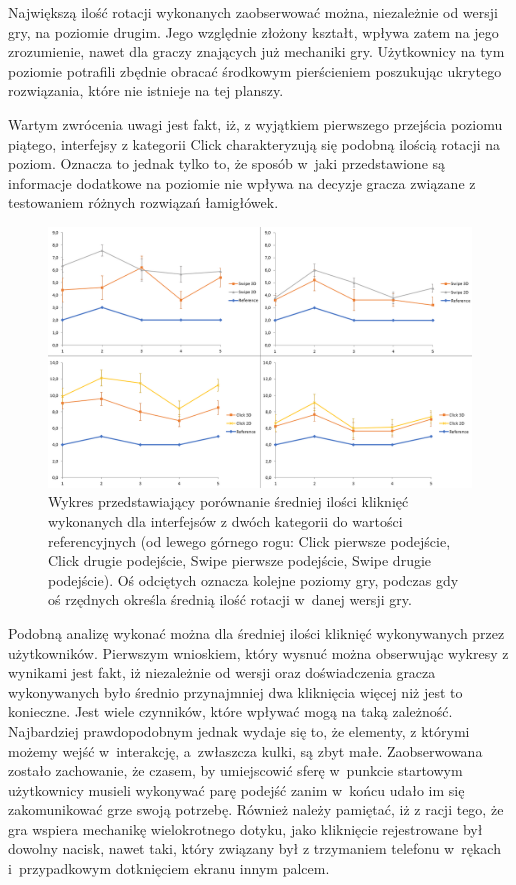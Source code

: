 \documentclass[a4paper,12pt,numbers=noenddot]{report}
\begin{document}
Największą ilość rotacji wykonanych zaobserwować można, niezależnie od wersji gry, na poziomie drugim. Jego względnie złożony kształt, wpływa zatem na jego zrozumienie, nawet dla graczy znających już mechaniki gry. Użytkownicy na tym poziomie potrafili zbędnie obracać środkowym pierścieniem poszukując ukrytego rozwiązania, które nie istnieje na tej planszy. 

Wartym zwrócenia uwagi jest fakt, iż, z wyjątkiem pierwszego przejścia poziomu piątego, interfejsy z kategorii Click charakteryzują się podobną ilością rotacji na poziom. Oznacza to jednak tylko to, że sposób w~jaki przedstawione są informacje dodatkowe na poziomie nie wpływa na decyzje gracza związane z testowaniem różnych rozwiązań łamigłówek. \\

\begin{figure}[h!]
	\centering
  	\includegraphics[width=\linewidth]{diag/ref_Clicks.png}
	\caption{Wykres przedstawiający porównanie średniej ilości kliknięć wykonanych dla interfejsów z dwóch kategorii do wartości referencyjnych (od lewego górnego rogu: Click pierwsze podejście, Click drugie podejście, Swipe pierwsze podejście, Swipe drugie podejście). Oś odciętych oznacza kolejne poziomy gry, podczas gdy oś rzędnych określa średnią ilość rotacji w~danej wersji gry.}
	\label{fig:ref:Clicks}
\end{figure}

Podobną analizę wykonać można dla średniej ilości kliknięć wykonywanych przez użytkowników. Pierwszym wnioskiem, który wysnuć można obserwując wykresy z wynikami jest fakt, iż niezależnie od wersji oraz doświadczenia gracza wykonywanych było średnio przynajmniej dwa kliknięcia więcej niż jest to konieczne. Jest wiele czynników, które wpływać mogą na taką zależność. Najbardziej prawdopodobnym jednak wydaje się to, że elementy,  z którymi możemy wejść w~interakcję, a~zwłaszcza kulki, są zbyt małe. Zaobserwowana zostało zachowanie, że czasem, by umiejscowić sferę w~punkcie startowym użytkownicy musieli wykonywać parę podejść zanim w~końcu udało im się zakomunikować grze swoją potrzebę. Również należy pamiętać, iż z racji tego, że gra wspiera mechanikę wielokrotnego dotyku, jako kliknięcie rejestrowane był dowolny nacisk, nawet taki, który związany był z trzymaniem telefonu w~rękach i~przypadkowym dotknięciem ekranu innym palcem. 
\end{document}
